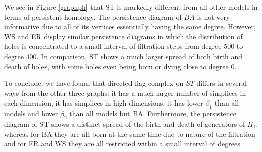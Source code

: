 We see in Figure \ref{graphph} that ST is markedly different from all other models in terms of persistent homology. The persistence diagram of $BA$ is not very informative due to all of its vertices essentially having the same degree. However, WS and ER display similar persistence diagrams in which the distribution of holes is concentrated to a small interval of filtration steps from degree $500$ to degree $400$. In comparison, ST shows a much larger spread of both birth and death of holes, with some holes even being born or dying close to degree $0$.

To conclude, we have found that directed flag complex on $ST$ differs in several ways from the other three graphs: it has a much larger number of simplices in each dimension, it has simplices in high dimensions, it has lower $\beta_{1}$ than all models and lower $\beta_{2}$ than all models but BA. Furthermore, the persistence diagram of ST shows a distinct spread of the birth and death of generators of $H_{1}$, whereas for BA they are all born at the same time due to nature of the filtration and for ER and WS they are all restricted within a small interval of degrees.
